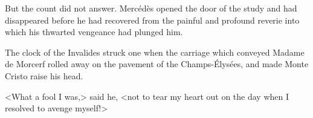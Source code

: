  But the count did not answer. Mercédès opened the door of the study and had disappeared before he had recovered from the painful and profound reverie into which his thwarted vengeance had plunged him. 

 The clock of the Invalides struck one when the carriage which conveyed Madame de Morcerf rolled away on the pavement of the Champs-Élysées, and made Monte Cristo raise his head. 

 <What a fool I was,> said he, <not to tear my heart out on the day when I resolved to avenge myself!> 